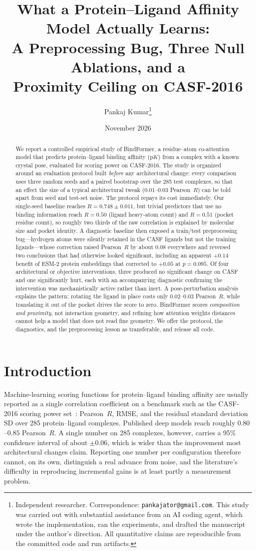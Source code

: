\documentclass[11pt]{article}
\title{\textbf{What a Protein--Ligand Affinity Model Actually Learns:\\
A Preprocessing Bug, Three Null Ablations, and a\\
Proximity Ceiling on CASF-2016}}
\author{Pankaj Kumar\thanks{Independent researcher. Correspondence: \texttt{pankajator@gmail.com}.
This study was carried out with substantial assistance from an AI coding agent, which
wrote the implementation, ran the experiments, and drafted the manuscript under the
author's direction. All quantitative claims are reproducible from the committed code and
run artifacts.}}
\date{November 2026}
\newcommand{\pearson}{Pearson~$R$}
\begin{document}
\maketitle

\begin{abstract}
We report a controlled empirical study of BindFormer, a residue--atom co-attention model
that predicts protein--ligand binding affinity ($\mathrm{p}K$) from a complex with a known
crystal pose, evaluated for scoring power on CASF-2016. The study is organized around an
evaluation protocol built \emph{before} any architectural change: every comparison uses
three random seeds and a paired bootstrap over the 285 test complexes, so that an effect
the size of a typical architectural tweak (0.01--0.03 \pearson{}) can be told apart from
seed and test-set noise. The protocol repays its cost immediately. Our single-seed
baseline reaches $R=0.748\pm0.011$, but trivial predictors that use no binding information
reach $R=0.50$ (ligand heavy-atom count) and $R=0.51$ (pocket residue count), so roughly
two thirds of the raw correlation is explained by molecular size and pocket identity. A
diagnostic baseline then exposed a train/test preprocessing bug---hydrogen atoms were
silently retained in the CASF ligands but not the training ligands---whose correction
raised \pearson{} by about $0.08$ everywhere and reversed two conclusions that had
otherwise looked significant, including an apparent $+0.14$ benefit of ESM-2 protein
embeddings that corrected to $+0.05$ at $p=0.095$. Of four architectural or objective
interventions, three produced no significant change on CASF and one significantly hurt,
each with an accompanying diagnostic confirming the intervention was mechanistically
active rather than inert. A pose-perturbation analysis explains the pattern: rotating the
ligand in place costs only $0.02$--$0.03$ \pearson{}, while translating it out of the
pocket drives the score to zero. BindFormer scores \emph{composition and proximity}, not
interaction geometry, and refining how attention weights distances cannot help a model
that does not read fine geometry. We offer the protocol, the diagnostics, and the
preprocessing lesson as transferable, and release all code.
\end{abstract}

\section{Introduction}

Machine-learning scoring functions for protein--ligand binding affinity are usually
reported as a single correlation coefficient on a benchmark such as the CASF-2016 scoring
power set~\cite{casf2016}: Pearson~$R$, RMSE, and the residual standard deviation SD over
285 protein--ligand complexes. Published deep models reach roughly $0.80$--$0.85$
\pearson{}. A single number on 285 complexes, however, carries a 95\% confidence interval
of about $\pm0.06$, which is wider than the improvement most architectural changes claim.
Reporting one number per configuration therefore cannot, on its own, distinguish a real
advance from noise, and the literature's difficulty in reproducing incremental gains is at
least partly a measurement problem.
\end{document}

